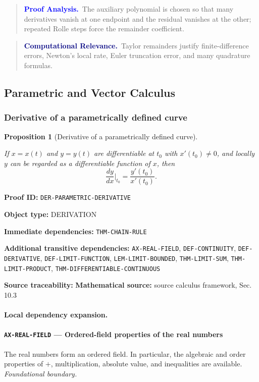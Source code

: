 \documentclass[10pt]{article}
\newcommand{\pidraw}[1]{\begingroup\urlstyle{tt}\nolinkurl{#1}\endgroup}
\newtheorem{proposition}[theorem]{Proposition}
\theoremstyle{definition}
\theoremstyle{remark}
\newenvironment{proofanalysis}
{\begin{quote}\small\noindent\textbf{\textcolor{blue}{Proof Analysis.}}\ }
{\end{quote}}
\newenvironment{computationalrelevance}
{\begin{quote}\small\noindent\textbf{\textcolor{navy}{Computational Relevance.}}\ }
{\end{quote}}
\newcommand{\meta}[2]{\noindent\textbf{#1:} #2\par}
\begin{document}
\begin{proofanalysis}The auxiliary polynomial is chosen so that many derivatives vanish at one endpoint and the residual vanishes at the other; repeated Rolle steps force the remainder coefficient.\end{proofanalysis}

\begin{computationalrelevance}Taylor remainders justify finite-difference errors, Newton's local rate, Euler truncation error, and many quadrature formulas.\end{computationalrelevance}

\subsection{Parametric and Vector Calculus}

\subsubsection{Derivative of a parametrically defined curve}

\begin{proposition}[Derivative of a parametrically defined curve]\label{prf:DER-PARAMETRIC-DERIVATIVE}

If $x=x(t)$ and $y=y(t)$ are differentiable at $t_0$ with $x'(t_0)\ne0$, and locally $y$ can be regarded as a differentiable function of $x$, then
\[
\frac{dy}{dx}\Big|_{t_0}=\frac{y'(t_0)}{x'(t_0)}.
\]

\end{proposition}

\meta{Proof ID}{\pidraw{DER-PARAMETRIC-DERIVATIVE}}
\meta{Object type}{DERIVATION}
\meta{Immediate dependencies}{\pidraw{THM-CHAIN-RULE}}
\meta{Additional transitive dependencies}{\pidraw{AX-REAL-FIELD}, \pidraw{DEF-CONTINUITY}, \pidraw{DEF-DERIVATIVE}, \pidraw{DEF-LIMIT-FUNCTION}, \pidraw{LEM-LIMIT-BOUNDED}, \pidraw{THM-LIMIT-SUM}, \pidraw{THM-LIMIT-PRODUCT}, \pidraw{THM-DIFFERENTIABLE-CONTINUOUS}}
\meta{Source traceability}{\textbf{Mathematical source:} source calculus framework, Sec. 10.3}

\paragraph{Local dependency expansion.}

\paragraph{\pidraw{AX-REAL-FIELD} --- Ordered-field properties of the real numbers}
The real numbers form an ordered field. In particular, the algebraic and order properties of $+$, multiplication, absolute value, and inequalities are available.
\textit{Foundational boundary.}
\end{document}
